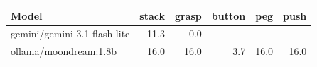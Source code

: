 \begin{tabular}{lrrrrr}
\toprule
Model & stack & grasp & button & peg & push \\
\midrule
gemini/gemini-3.1-flash-lite & 11.3 & 0.0 & -- & -- & -- \\
ollama/moondream:1.8b & 16.0 & 16.0 & 3.7 & 16.0 & 16.0 \\
\bottomrule
\end{tabular}